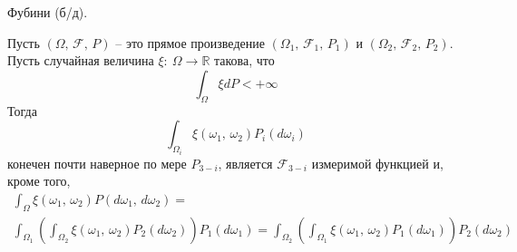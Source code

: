 \begin{theorem}
	Фубини (б/д).

	Пусть $(\Omega,\, \mathcal{F},\, P)$ -- это прямое произведение $(\Omega_1,\, \mathcal{F}_1,\, P_1)$ и $(\Omega_2,\, \mathcal{F}_2,\, P_2)$. Пусть случайная величина $\xi:\: \Omega \to \mathbb{R}$ такова, что
	\[\int_\Omega \xi dP < +\infty\]
	Тогда
	\[\int_{\Omega_i}\xi(\omega_1,\, \omega_2)P_i(d\omega_i)\]
	конечен почти наверное по мере $P_{3 - i}$, является $\mathcal{F}_{3 - i}$ измеримой функцией и, кроме того,
	\begin{align*}
		\int_\Omega \xi(\omega_1,\, \omega_2)P(d\omega_1,\, d\omega_2) = \\
		\int_{\Omega_1}\left(\int_{\Omega_2}\xi(\omega_1,\, \omega_2)P_2(d\omega_2)\right)P_1(d\omega_1) = \int_{\Omega_2}\left(\int_{\Omega_1}\xi(\omega_1,\, \omega_2)P_1(d\omega_1)\right)P_2(d\omega_2)
	\end{align*}
\end{theorem}

